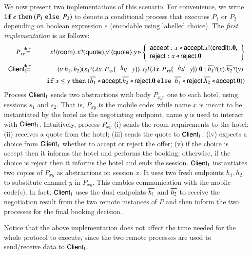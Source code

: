 We now present two \HOp implementations of this scenario.
For convenience, we write $\mathtt{if}\  e\ \mathtt{then}\  (P_1\ \mathtt{else}\  \ P_2)$ 
to denote a conditional process that executes $P_1$ or $P_2$ depending on boolean expression $e$ (encodable using labelled choice).
The \emph{first implementation} is  as follows:
%
	\begin{eqnarray*}%
		 P_{xy}  \!\!\! & \defeq &  \!\!\! \bout{x}{\rtype} \binp{x}{\Quote} \bout{y}{\Quote}
		y \triangleright \left\{
				\begin{array}{l}
					\accept: \bsel{x}{\accept} \bout{x}{\creditc} \inact,\\
					\reject: \bsel{x}{\reject} \inact
				\end{array}
				\right\}
		\\ %
		 \Client_1 \!\!\!\!\! & \defeq  &  \!\!\! \newsp{h_1, h_2}{\bout{s_1}{\abs{x}{P_{xy} \subst{h_1}{y}}} \bout{s_2}{\abs{x}{P_{xy} \subst{h_2}{y}}} \inact \Par \binp{\dual{h_1}}{x} \binp{\dual{h_2}}{y} \\
		& & 
		\quad  \If x \leq y\   \Then (\bsel{\dual{h_1}}{\accept} \bsel{\dual{h_2}}{\reject} \inact \ \Else \ \bsel{\dual{h_1}}{\reject} \bsel{\dual{h_2}}{\accept} \inact )
		}
	\end{eqnarray*}
%
Process $\mathsf{Client}_1$ sends two abstractions with body $P_{xy}$, one to each hotel, 
		using sessions $s_1$ and $s_2$.
		That is, $P_{xy}$ is the mobile code:
	while
		name $x$ is meant to be instantiated by the hotel as the negotiating
		endpoint, name $y$ is used to interact with $\mathsf{Client}_1$.	
		Intuitively, process $P_{xy}$ (i)  sends the room requirements to the hotel;
		(ii) receives a quote from the hotel;
		(iii) sends the quote to  $\mathsf{Client}_1$;
		(iv) expects a choice from   $\mathsf{Client}_1$ whether to accept or reject the offer;
		(v) if the choice is accept then it informs the hotel and performs the booking;
		otherwise, if the choice is reject then it informs the hotel and ends the session.
				$\mathsf{Client}_1$ instantiates two copies of  $P_{xy}$ as abstractions
		on session $x$. It uses two
		fresh endpoints $h_1, h_2$ to substitute channel $y$
		in $P_{xy}$. This enables communication with the mobile code(s).
		In fact, 
		$\mathsf{Client}_1$ uses the dual endpoints $\overline{h_1}$ and $\overline{h_2}$
		to receive the negotiation
		result from the two remote instances of $P$ and then inform the two
		processes for the final booking decision.

Notice that	the above implementation does not affect
the time needed for the whole protocol to execute,
since the two remote processes are used
to send/receive data to $\mathsf{Client}_1$.

